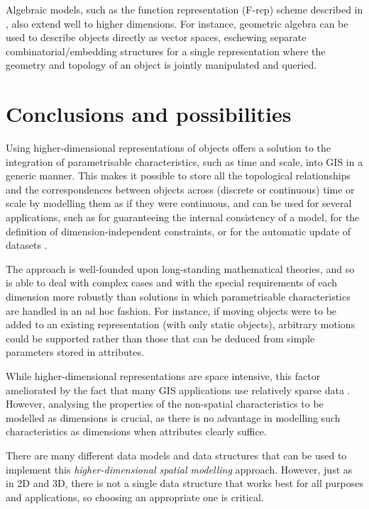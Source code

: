Algebraic models, such as the function representation (F-rep) scheme \citep{Pasko95} described in , also extend well to higher dimensions.
For instance, geometric algebra \citep{Artin11} can be used to describe objects directly as vector spaces, eschewing separate combinatorial/embedding structures for a single representation where the geometry and topology of an object is jointly manipulated and queried.

\section{Conclusions and possibilities}
\label{se:nd-modelling-conclusions}

Using higher-dimensional representations of objects offers a solution to the integration of parametrisable characteristics, such as time and scale, into GIS in a generic manner.
This makes it possible to store all the topological relationships and the correspondences between objects across (discrete or continuous) time or scale by modelling them as if they were continuous, and can be used for several applications, such as for guaranteeing the internal consistency of a model, for the definition of dimension-independent constraints, or for the automatic update of datasets \citep{vanOosterom10}.

The approach is well-founded upon long-standing mathematical theories, and so is able to deal with complex cases and with the special requirements of each dimension more robustly than solutions in which parametrisable characteristics are handled in an ad hoc fashion.
For instance, if moving objects were to be added to an existing representation (with only static objects), arbitrary motions could be supported rather than those that can be deduced from simple parameters stored in attributes.

While higher-dimensional representations are space intensive, this factor ameliorated by the fact that many GIS applications use relatively sparse data \citep{McKenzie01,Mason94}.
However, analysing the properties of the non-spatial characteristics to be modelled as dimensions is crucial, as there is no advantage in modelling such characteristics as dimensions when attributes clearly suffice.

There are many different data models and data structures that can be used to implement this \emph{higher-dimensional spatial modelling} approach.
However, just as in 2D and 3D, there is not a single data structure that works best for all purposes and applications, so choosing an appropriate one is critical.

